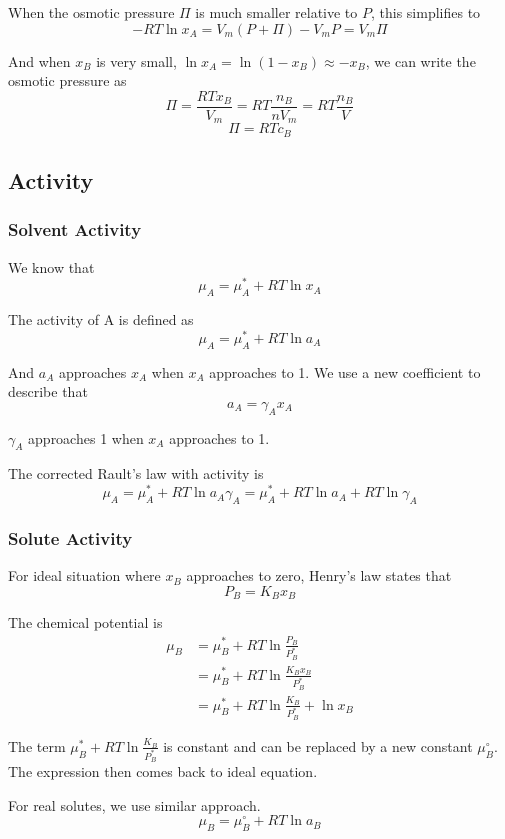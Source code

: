 \documentclass[letterpaper]{article}
\newcommand{\zero}{^\circ}
\begin{document}
When the osmotic pressure $\Pi$ is much smaller relative to $P$, this simplifies to
\begin{equation*}
    -RT\ln x_A=V_m\left(P+\Pi\right)-V_mP=V_m\Pi
\end{equation*}

And when $x_B$ is very small, $\ln x_A=\ln\left(1-x_B\right)\approx-x_B$, we can write the osmotic
pressure as
\begin{equation*}
    \Pi=\frac{RTx_B}{V_m}=RT\frac{n_B}{nV_m}=RT\frac{n_B}{V}
\end{equation*}
\begin{equation*}
    \boxed{\Pi=RTc_B}
\end{equation*}
\subsection*{Activity}
\subsubsection*{Solvent Activity}
We know that
\begin{equation*}
    \mu_A=\mu_A^*+RT\ln x_A
\end{equation*}

The activity of A is defined as
\begin{equation*}
    \mu_A=\mu_A^*+RT\ln a_A
\end{equation*}

And $a_A$ approaches $x_A$ when $x_A$ approaches to 1. We use a new coefficient to describe that
\begin{equation*}
    a_A=\gamma_Ax_A
\end{equation*}

$\gamma_A$ approaches 1 when $x_A$ approaches to 1.

The corrected Rault's law with activity is
\begin{equation*}
    \mu_A=\mu_A^*+RT\ln a_A\gamma_A=\mu_A^*+RT\ln a_A+RT\ln\gamma_A
\end{equation*}
\subsubsection*{Solute Activity}
For ideal situation where $x_B$ approaches to zero, Henry's law states that
\begin{equation*}
    P_B=K_Bx_B
\end{equation*}

The chemical potential is
\begin{equation*}
    \begin{aligned}
        \mu_B & =\mu_B^*+RT\ln\frac{P_B}{P_B^*}         \\
              & =\mu_B^*+RT\ln\frac{K_Bx_B}{P_B^*}      \\
              & =\mu_B^*+RT\ln\frac{K_B}{P_B^*}+\ln x_B
    \end{aligned}
\end{equation*}

The term $\mu_B^*+RT\ln\frac{K_B}{P_B^*}$ is constant and can be replaced by a
new constant $\mu_B\zero$. The expression then comes back to ideal equation.

For real solutes, we use similar approach.
\begin{equation*}
    \mu_B=\mu_B\zero+RT\ln a_B
\end{equation*}
\end{document}
